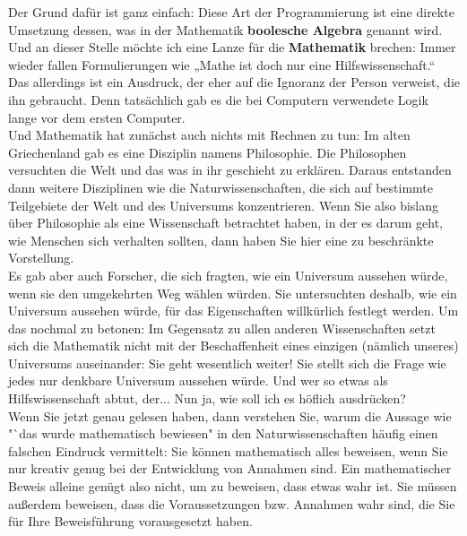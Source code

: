 Der Grund dafür ist ganz einfach: Diese Art der Programmierung ist eine direkte Umsetzung dessen, was in der Mathematik \textbf{boolesche Algebra} genannt wird. Und an dieser Stelle möchte ich eine Lanze für die \textbf{Mathematik} brechen: Immer wieder fallen Formulierungen wie „Mathe ist doch nur eine Hilfswissenschaft.“ Das allerdings ist ein Ausdruck, der eher auf die Ignoranz der Person verweist, die ihn gebraucht. Denn tatsächlich gab es die bei Computern verwendete Logik lange vor dem ersten Computer. \\

Und Mathematik hat zunächst auch nichts mit Rechnen zu tun: Im alten Griechenland gab es eine Disziplin namens Philosophie. Die Philosophen versuchten die Welt und das was in ihr geschieht zu erklären. Daraus entstanden dann weitere Disziplinen wie die Naturwissenschaften, die sich auf bestimmte Teilgebiete der Welt und des Universums konzentrieren. Wenn Sie also bislang über Philosophie als eine Wissenschaft betrachtet haben, in der es darum geht, wie Menschen sich verhalten sollten, dann haben Sie hier eine zu beschränkte Vorstellung.\\

Es gab aber auch Forscher, die sich fragten, wie ein Universum aussehen würde, wenn sie den umgekehrten Weg wählen würden. Sie untersuchten deshalb, wie ein Universum aussehen würde, für das Eigenschaften willkürlich festlegt werden. Um das nochmal zu betonen: Im Gegensatz zu allen anderen Wissenschaften setzt sich die Mathematik nicht mit der Beschaffenheit eines einzigen (nämlich unseres) Universums auseinander: Sie geht wesentlich weiter! Sie stellt sich die Frage wie jedes nur denkbare Universum aussehen würde. Und wer so etwas als Hilfswissenschaft abtut, der... Nun ja, wie soll ich es höflich ausdrücken? \\

Wenn Sie jetzt genau gelesen haben, dann verstehen Sie, warum die Aussage wie "`das wurde mathematisch bewiesen" in den Naturwissenschaften häufig einen falschen Eindruck vermittelt: Sie können mathematisch alles beweisen, wenn Sie nur kreativ genug bei der Entwicklung von Annahmen sind. Ein mathematischer Beweis alleine genügt also nicht, um zu beweisen, dass etwas wahr ist. Sie müssen außerdem beweisen, dass die Voraussetzungen bzw. Annahmen wahr sind, die Sie für Ihre Beweisführung vorausgesetzt haben.\\

